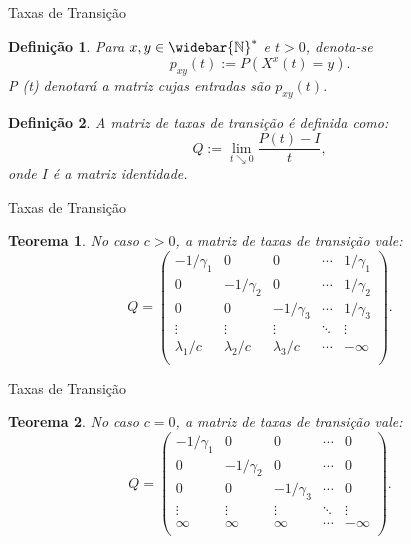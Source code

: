 \documentclass[xcolor=pdftex,dvipsnames]{beamer}
\newcommand{\Nzb}{{\mathbb{\widebar{N}^*}}}
\newtheorem{teorema}{Teorema}
\newtheorem{definicao}{Definição}
\begin{document}
\begin{frame}{Taxas de Transição}
  \begin{definicao}
    Para $x, y \in \Nzb$ e $t > 0$, denota-se
    \begin{displaymath}
      p_{x y} (t) := P \left( X^x(t) = y \right).
    \end{displaymath}
    P (t) denotará a matriz cujas entradas são $p_{x y} (t)$.
  \end{definicao} \pause
  \begin{definicao}
    A matriz de taxas de transição é definida como:
    \begin{displaymath}
      Q := \lim_{t \searrow 0} \frac{P(t) - I}{t},
    \end{displaymath}
    onde $I$ é a matriz identidade.
  \end{definicao}
\end{frame}

\begin{frame}{Taxas de Transição}
  \begin{teorema}
    No caso $c > 0$, a matriz de taxas de transição vale:
    \begin{displaymath}
      Q = \left(
        \begin{array}{ccccc}
          -1/\gamma_1 & 0 & 0 & \cdots & 1/\gamma_1\\
          0 & -1/\gamma_2 & 0 & \cdots & 1/\gamma_2\\
          0 & 0 & -1/\gamma_3 & \cdots & 1/\gamma_3\\
          \vdots & \vdots & \vdots & \ddots & \vdots \\
          \lambda_1/c & \lambda_2/c &
          \lambda_3/c & \cdots & -\infty\\
        \end{array}
      \right).
    \end{displaymath}
  \end{teorema}
\end{frame}

\begin{frame}{Taxas de Transição}
  \begin{teorema}
    No caso $c = 0$, a matriz de taxas de transição vale:
    \begin{displaymath}
      Q = \left(
        \begin{array}{ccccc}
          -1/\gamma_1 & 0 & 0 & \cdots & 0\\
          0 & -1/\gamma_2 & 0 & \cdots & 0\\
          0 & 0 & -1/\gamma_3 & \cdots & 0\\
          \vdots & \vdots & \vdots & \ddots & \vdots \\
          \infty & \infty & \infty & \cdots & -\infty\\
        \end{array}
      \right).
    \end{displaymath}
  \end{teorema}
\end{frame}
\end{document}
